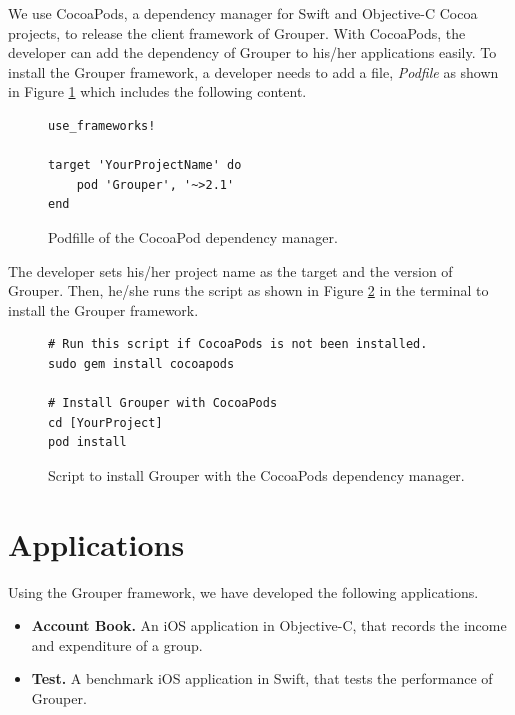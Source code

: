\documentclass[a4paper,11pt]{report}
\begin{document}
We use CocoaPods\cite{cocoapods}, a dependency manager for Swift and Objective-C Cocoa projects, to release the client framework of Grouper.
With CocoaPods, the developer can add the dependency of Grouper to his/her applications easily.
To install the Grouper framework, a developer needs to add a file, \emph{Podfile} as shown in Figure \ref{fig:podfile} which includes the following content.

\begin{figure}
\begin{lstlisting}[frame=none language=Ruby] 
use_frameworks!

target 'YourProjectName' do
    pod 'Grouper', '~>2.1'
end
\end{lstlisting}
\caption{Podfille of the CocoaPod dependency manager.}
\label{fig:podfile}
\end{figure}

The developer sets his/her project name as the target and the version of Grouper.
Then, he/she runs the script as shown in Figure \ref{fig:install_grouper} in the terminal to install the Grouper framework.

\begin{figure}
\begin{lstlisting}[frame=none language=shell] 
# Run this script if CocoaPods is not been installed.
sudo gem install cocoapods

# Install Grouper with CocoaPods
cd [YourProject]
pod install
\end{lstlisting}
\caption{Script to install Grouper with the CocoaPods dependency manager.}
\label{fig:install_grouper}
\end{figure}

\section{Applications} \label{section:application}

Using the Grouper framework, we have developed the following applications. 

\begin{itemize}
	\setlength{\itemsep}{1pt}
	\setlength{\parskip}{0pt}
	\setlength{\parsep}{0pt}
	\item \textbf{Account Book.} An iOS application in Objective-C, that records the income and expenditure of a group.
	\item \textbf{Test.} A benchmark iOS application in Swift, that tests the performance of Grouper.
\end{itemize}
\end{document}
